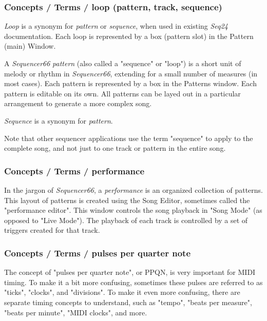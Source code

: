 \subsubsection{Concepts / Terms / loop (pattern, track, sequence)}
\label{subsubsec:concepts_terms_loop}

   \textsl{Loop}
   is a synonym for \textsl{pattern} or \textsl{sequence}, when used
   in existing \textsl{Seq24} documentation.
   Each loop is represented by a box (pattern slot) in the Pattern (main)
   Window.

   A \textsl{Sequencer66} \textsl{pattern}
   (also called a "sequence" or "loop")
   is a short unit of melody or rhythm in \textsl{Sequencer66},
   extending for a small number of measures (in most cases).
   Each pattern is represented by a box in the Patterns window.
   Each pattern is editable on its own.  All patterns can be layed out in
   a particular arrangement to generate a more complex song.

   \textsl{Sequence} is
   a synonym for \textsl{pattern}.

   Note that other sequencer applications use the term "sequence"
   to apply to the complete song, and not just to one track or pattern in the
   entire song.

\subsubsection{Concepts / Terms / performance}
\label{subsubsec:concepts_terms_performance}

   In the jargon of \textsl{Sequencer66}, a
   \textsl{performance} is an organized collection of patterns.
   This layout of patterns is created using the Song Editor, sometimes
   called the "performance editor".
   This window controls the song playback in "Song Mode" (as opposed to "Live
   Mode").
   The playback of each track is controlled by a set of triggers created for
   that track.

\subsubsection{Concepts / Terms / pulses per quarter note}
\label{subsubsec:concepts_terms_pulses}

   The concept of "pulses per quarter note", or PPQN, is very important for
   MIDI timing.  To make it a bit more confusing, sometimes these pulses are
   referred to as "ticks", "clocks", and "divisions".
   To make it even more confusing, there are separate timing concepts to
   understand, such as "tempo", "beats per measure", "beats per minute",
   "MIDI clocks", and more.

